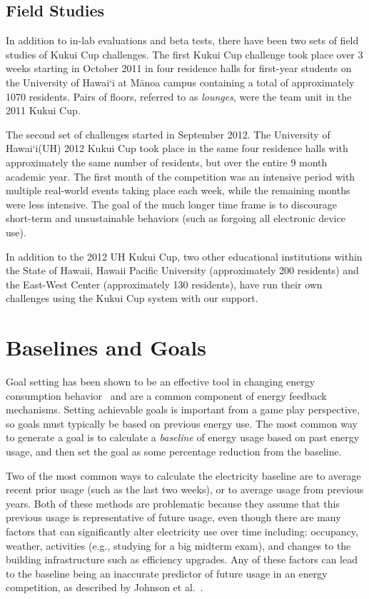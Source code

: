 \documentclass[10pt, conference, compsocconf]{IEEEtran-old}
\newcommand{\Hawaii}{Hawai`i\xspace}
\newcommand{\Manoa}{M\=anoa\xspace}
\begin{document}
\subsection{Field Studies}

In addition to in-lab evaluations and beta tests, there have been two sets of field studies of Kukui Cup challenges. The first Kukui Cup challenge took place over 3 weeks starting in October 2011 in four residence halls for first-year students on the University of \Hawaii at \Manoa campus containing a total of approximately 1070 residents. Pairs of floors, referred to as \emph{lounges}, were the team unit in the 2011 Kukui Cup.

The second set of challenges started in September 2012. The University of \Hawaii (UH) 2012 Kukui Cup took place in the same four residence halls with approximately the same number of residents, but over the entire 9 month academic year. The first month of the competition was an intensive period with multiple real-world events taking place each week, while the remaining months were less intensive. The goal of the much longer time frame is to discourage short-term and unsustainable behaviors (such as forgoing all electronic device use).

In addition to the 2012 UH Kukui Cup, two other educational institutions within the State of Hawaii, Hawaii Pacific University (approximately 200 residents) and the East-West Center (approximately 130 residents), have run their own challenges using the Kukui Cup system with our support.

\section{Baselines and Goals}
\label{sec:goals-baselines}

Goal setting has been shown to be an effective tool in changing energy consumption behavior~\cite{Becker78, Houwelingen89} and are a common component of energy feedback mechanisms. Setting achievable goals is important from a game play perspective, so goals must typically be based on previous energy use. The most common way to generate a goal is to calculate a \emph{baseline} of energy usage based on past energy usage, and then set the goal as some percentage reduction from the baseline.

Two of the most common ways to calculate the electricity baseline are to average recent prior usage (such as the last two weeks), or to average usage from previous years. Both of these methods are problematic because they assume that this previous usage is representative of future usage, even though there are many factors that can significantly alter electricity use over time including: occupancy, weather, activities (e.g., studying for a big midterm exam), and changes to the building infrastructure such as efficiency upgrades. Any of these factors can lead to the baseline being an inaccurate predictor of future usage in an energy competition, as described by Johnson et al.~\cite{csdl2-12-08}.
\end{document}
